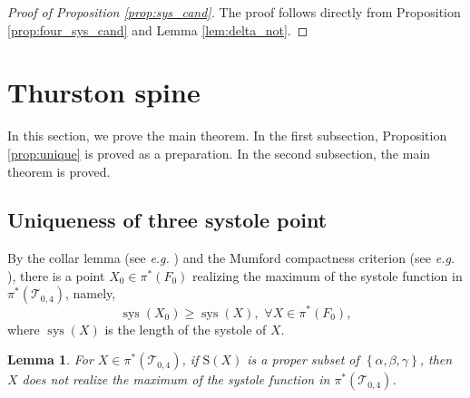 \documentclass[UTF8]{amsart}
\newtheorem{lemma}[theorem]{Lemma}
\numberwithin{equation}{section}
\theoremstyle{definition}
\theoremstyle{example}
\theoremstyle{remark}
\DeclareMathOperator{\sys}{sys}
\begin{document}
\begin{proof}[Proof of Proposition \ref{prop:sys_cand}]
 The proof follows directly from Proposition \ref{prop:four_sys_cand} and Lemma \ref{lem:delta_not}. 
\end{proof}

\section{Thurston spine}
\label{sec:main}

In this section, we prove the main theorem. In the first subsection, Proposition \ref{prop:unique} is proved as a preparation. In the second subsection, the main theorem is proved. 

\subsection{Uniqueness of three systole point}
By the collar lemma (see \emph{e.g.} \cite[Theorem 4.1.1]{buser2010geometry}) and the Mumford compactness criterion (see \emph{e.g.} \cite{mumford1971remark}), there is a point $X_0 \in \pi^{*}(F_0)$ realizing the maximum of the systole function in $\pi^{*}(\mathcal{T}_{0,4})$, namely, $$\sys(X_0) \ge  \sys(X),\,\, \forall X \in \pi^{*}(F_0), $$
where $\sys(X)$ is the length of the systole of $X$. 
\begin{lemma}
 For $X\in \pi^{*}(\mathcal{T}_{0,4})$, if $\mathrm{S}(X) $ is a proper subset of $ \left\{ \alpha, \beta, \gamma \right\}$, then $X$ does not realize  the maximum of the systole function in $\pi^{*}(\mathcal{T}_{0,4})$. 

 \label{lem:max_abc}
\end{lemma}
\end{document}
